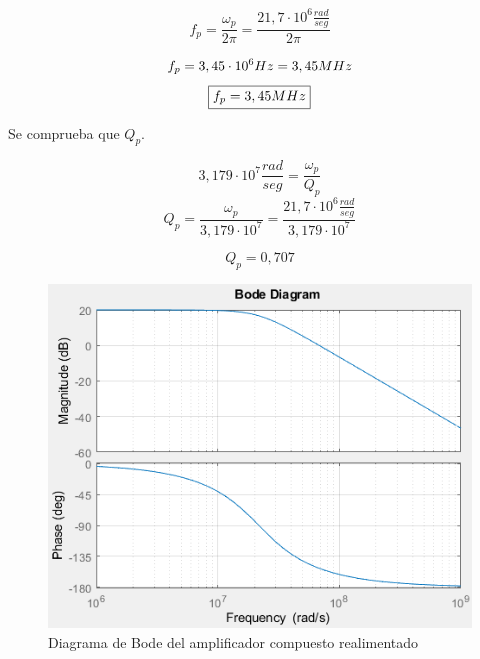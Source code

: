 \begin{equation}
    f_p = \frac{\omega_p}{2\pi}=\frac{21,7 \cdot 10^6 \frac{rad}{seg}}{2\pi}
\end{equation}

\begin{equation}
    f_p = 3,45\cdot 10^6 \space Hz= 3,45\space MHz
\end{equation}
\begin{equation}
    \boxed{
    f_p = 3,45\space MHz
    }
\end{equation}

\bigskip
\hspace{1mm} Se comprueba que \( Q_p \).

\begin{equation}
    3,179 \cdot 10^7 \frac{rad}{seg} = \frac{\omega_p}{Q_p} 
\end{equation}
\begin{equation}
    Q_p = \frac{\omega_p}{3,179 \cdot 10^7} = \frac{21,7 \cdot 10^6 \frac{rad}{seg}}{3,179 \cdot 10^7}
\end{equation}

\begin{equation}
    \boxed{
    Q_p = 0,707
    }
\end{equation}


\begin{figure}[!h]
    \centering
    \includegraphics[scale=0.8]{Imagenes/comp_feedback.png}
    \caption{Diagrama de Bode del amplificador compuesto realimentado}
\end{figure}

